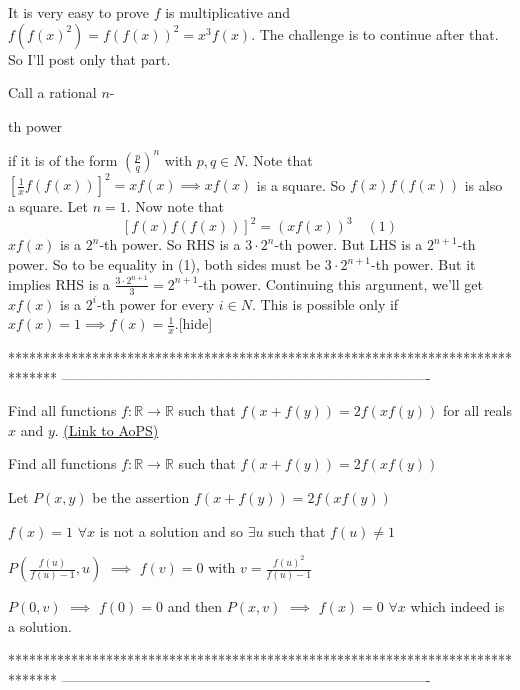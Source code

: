 \begin{solution}It is very easy to prove $f$ is multiplicative and $f(f(x)^2)=f(f(x))^2=x^3f(x)$. The challenge is to continue after that. So I'll post only that part.

Call a rational $n$-\begin{italicized}th power\end{italicized} if it is of the form $\left (\frac p q \right )^n$ with $p,q\in N$. Note that $\left [\frac 1 x f(f(x))\right ]^2=xf(x)\implies xf(x)$ is a square. So $f(x)f(f(x))$ is also a square. Let $n=1$. Now note that \[[f(x)f(f(x))]^2=(xf(x))^3\quad (1)\]
$xf(x)$ is a $2^n$-th power. So RHS is a $3\cdot2^n$-th power. But LHS is a $2^{n+1}$-th power. So to be equality in (1), both sides must be $3\cdot 2^{n+1}$-th power. But it implies RHS is a $\frac {3\cdot 2^{n+1}}3=2^{n+1}$-th power. Continuing this argument, we'll get $xf(x)$ is a $2^i$-th power for every $i\in N$. This is possible only if $xf(x)=1\implies f(x)=\frac 1 x$.[\/hide]
\end{solution}
*******************************************************************************
-------------------------------------------------------------------------------

\begin{problem}
	Find all functions $f: \mathbb{R} \to \mathbb{R} $ such that $f(x + f(y)) = 2f(xf(y))$ for all reals $x$ and $y$.
	\flushright \href{https://artofproblemsolving.com/community/c6h413312}{(Link to AoPS)}
\end{problem}



\begin{solution}
	\begin{tcolorbox}Find all functions $f: \mathbb{R} \to \mathbb{R} $ such that $f(x + f(y)) = 2f(xf(y))$\end{tcolorbox}
Let $P(x,y)$ be the assertion $f(x+f(y))=2f(xf(y))$

$f(x)=1$ $\forall x$ is not a solution and so $\exists u$ such that $f(u)\ne 1$

$P(\frac{f(u)}{f(u)-1},u)$ $\implies$ $f(v)=0$ with $v=\frac{f(u)^2}{f(u)-1}$

$P(0,v)$ $\implies$ $f(0)=0$ and then $P(x,v)$ $\implies$ $\boxed{f(x)=0}$ $\forall x$ which indeed is a solution.
\end{solution}
*******************************************************************************
-------------------------------------------------------------------------------

